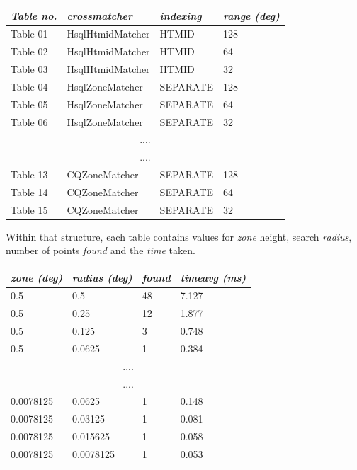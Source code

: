 \documentclass{article}
\newcommand{\crossmatcher} {crossmatcher\xspace}
\begin{document}
\begin{table}[hbt!]
\centering
\begin{tabular}{|l|l|l|l|}
\hline
\textit{Table no.} & \textit{\crossmatcher} & \textit{indexing} & \textit{range (deg)} \\ \hline
Table 01 & HsqlHtmidMatcher & HTMID & 128 \\ \hline
Table 02 & HsqlHtmidMatcher & HTMID & 64 \\ \hline
Table 03 & HsqlHtmidMatcher & HTMID & 32 \\ \hline
Table 04 & HsqlZoneMatcher & SEPARATE & 128 \\ \hline
Table 05 & HsqlZoneMatcher & SEPARATE & 64 \\ \hline
Table 06 & HsqlZoneMatcher & SEPARATE & 32 \\ \hline
\multicolumn{4}{|c|}{....} \\ \hline
\multicolumn{4}{|c|}{....} \\ \hline
Table 13 & CQZoneMatcher & SEPARATE & 128 \\ \hline
Table 14 & CQZoneMatcher & SEPARATE & 64 \\ \hline
Table 15 & CQZoneMatcher & SEPARATE & 32 \\ \hline
\end{tabular}
\end{table}

Within that structure, each table contains values for \textit{zone} height, search \textit{radius}, number of points \textit{found} and the \textit{time} taken.

\begin{table}[hbt!]
\centering
\begin{tabular}{|l|l|l|l|}
\hline
\textit{zone (deg)} & \textit{radius (deg)} & \textit{found} & \textit{timeavg (ms)} \\ \hline
0.5 & 0.5    & 48 & 7.127 \\ \hline
0.5 & 0.25   & 12 & 1.877 \\ \hline
0.5 & 0.125  &  3 & 0.748 \\ \hline
0.5 & 0.0625 &  1 & 0.384 \\ \hline
\multicolumn{4}{|c|}{....} \\ \hline
\multicolumn{4}{|c|}{....} \\ \hline
0.0078125 & 0.0625    & 1 & 0.148 \\ \hline
0.0078125 & 0.03125   & 1 & 0.081 \\ \hline
0.0078125 & 0.015625  & 1 & 0.058 \\ \hline
0.0078125 & 0.0078125 & 1 & 0.053 \\ \hline
\end{tabular}
\end{table}
\end{document}
